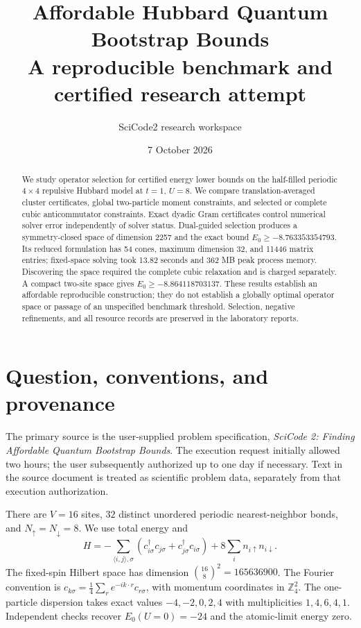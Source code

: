 \documentclass[11pt]{article}
\title{Affordable Hubbard Quantum Bootstrap Bounds\\\large A reproducible benchmark and certified research attempt}
\author{SciCode2 research workspace}
\date{7 October 2026}
\begin{document}
\maketitle
\begin{abstract}
We study operator selection for certified energy lower bounds on the half-filled periodic $4\times4$ repulsive Hubbard model at $t=1$, $U=8$. We compare translation-averaged cluster certificates, global two-particle moment constraints, and selected or complete cubic anticommutator constraints. Exact dyadic Gram certificates control numerical solver error independently of solver status. Dual-guided selection produces a symmetry-closed space of dimension 2257 and the exact bound $E_0\ge -8.763353354793$. Its reduced formulation has 54 cones, maximum dimension 32, and 11446 matrix entries; fixed-space solving took 13.82 seconds and 362 MB peak process memory. Discovering the space required the complete cubic relaxation and is charged separately. A compact two-site space gives $E_0\ge -8.864118703137$. These results establish an affordable reproducible construction; they do not establish a globally optimal operator space or passage of an unspecified benchmark threshold. Selection, negative refinements, and all resource records are preserved in the laboratory reports.
\end{abstract}

\section{Question, conventions, and provenance}
The primary source is the user-supplied problem specification, \emph{SciCode 2: Finding Affordable Quantum Bootstrap Bounds}. The execution request initially allowed two hours; the user subsequently authorized up to one day if necessary. Text in the source document is treated as scientific problem data, separately from that execution authorization.

There are $V=16$ sites, $32$ distinct unordered periodic nearest-neighbor bonds, and $N_\uparrow=N_\downarrow=8$. We use total energy and
\begin{equation}
 H=-\sum_{\langle i,j\rangle,\sigma}(c^\dagger_{i\sigma}c_{j\sigma}+c^\dagger_{j\sigma}c_{i\sigma})
       +8\sum_i n_{i\uparrow}n_{i\downarrow}.
\end{equation}
The fixed-spin Hilbert space has dimension $\binom{16}{8}^2=165636900$. The Fourier convention is $c_{k\sigma}=\frac14\sum_r e^{-ik\cdot r}c_{r\sigma}$, with momentum coordinates in $\mathbb Z_4^2$. The one-particle dispersion takes exact values $-4,-2,0,2,4$ with multiplicities $1,4,6,4,1$. Independent checks recover $E_0(U=0)=-24$ and the atomic-limit energy zero.
\end{document}
